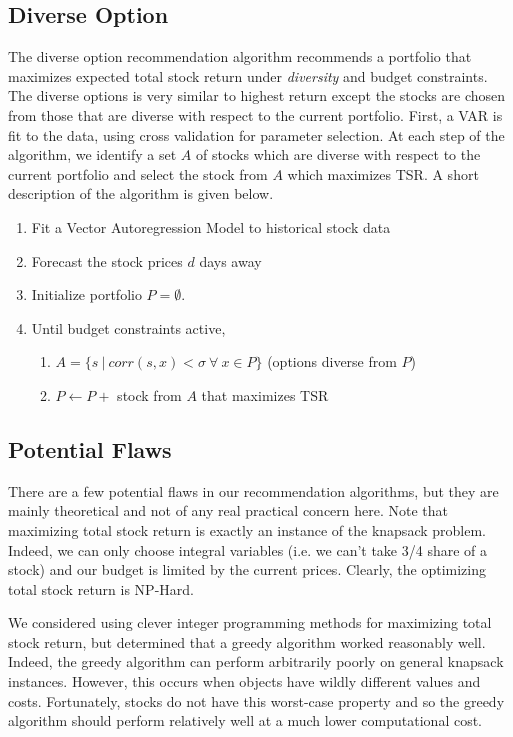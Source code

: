 \documentclass{article}
\begin{document}
\subsection{Diverse Option}
The diverse option recommendation algorithm recommends a portfolio that maximizes expected total stock return under \emph{diversity} and budget constraints. The diverse options is very similar to highest return except the stocks are chosen from those that are diverse with respect to the current portfolio. First, a VAR is fit to the data, using cross validation for parameter selection. At each step of the algorithm, we identify a set $A$ of stocks which are diverse with respect to the current portfolio and select the stock from $A$ which maximizes TSR. A short description of the algorithm is given below.

\begin{enumerate}
	\item Fit a Vector Autoregression Model to historical stock data
	\item Forecast the stock prices $d$ days away
	\item Initialize portfolio $P = \emptyset$. 
	\item Until budget constraints active,
		\begin{enumerate}
			\item $A = \{s \ | \ corr(s,x) < \sigma \ \forall \ x \in P\}$ (options diverse from $P$)
			\item $P \leftarrow P +$ stock from $A$ that maximizes TSR
		\end{enumerate}
\end{enumerate}

\subsection{Potential Flaws}
There are a few potential flaws in our recommendation algorithms, but they are mainly theoretical and not of any real practical concern here. Note that maximizing total stock return is exactly an instance of the knapsack problem. Indeed, we can only choose integral variables (i.e. we can't take 3/4 share of a stock) and our budget is limited by the current prices. Clearly, the optimizing total stock return is NP-Hard. 

We considered using clever integer programming methods for maximizing total stock return, but determined that a greedy algorithm worked reasonably well. Indeed, the greedy algorithm can perform arbitrarily poorly on general knapsack instances. However, this occurs when objects have wildly different values and costs. Fortunately, stocks do not have this worst-case property and so the greedy algorithm should perform relatively well at a much lower computational cost.
\end{document}
